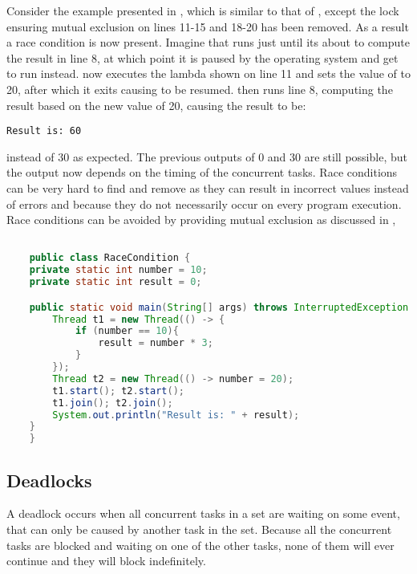 Consider the example presented in , which is similar to that of , except the lock ensuring mutual exclusion on lines 11-15 and 18-20 has been removed. As a result a race condition is now present. Imagine that  runs just until its about to compute the result in line 8, at which point it is paused by the operating system and  get to run instead.  now executes the lambda shown on line 11 and sets the value of  to 20, after which it exits causing  to be resumed.  then runs line 8, computing the result based on the new  value of 20, causing the result to be:
\begin{verbatim}
Result is: 60
\end{verbatim}
instead of 30 as expected. The previous outputs of 0 and 30 are still possible, but the output now depends on the timing of the concurrent tasks. Race conditions can be very hard to find and remove as they can result in incorrect values instead of errors and because they do not necessarily occur on every program execution. Race conditions can be avoided by providing mutual exclusion as discussed in ,
\begin{lstlisting}[label=lst:racecondition,
  caption={Race condition example},
  language=Java,  
  showspaces=false,
  showtabs=false,
  breaklines=true,
  showstringspaces=false,
  breakatwhitespace=true,
  commentstyle=\color{greencomments},
  keywordstyle=\color{bluekeywords},
  stringstyle=\color{redstrings}]  % Start your code-block

	public class RaceCondition {
    private static int number = 10;
    private static int result = 0;

    public static void main(String[] args) throws InterruptedException {
        Thread t1 = new Thread(() -> {
            if (number == 10){
                result = number * 3;
            }
        });
        Thread t2 = new Thread(() -> number = 20);
        t1.start(); t2.start();
        t1.join(); t2.join();
        System.out.println("Result is: " + result);
    }
	}
\end{lstlisting}
 
\subsection{Deadlocks}
A deadlock occurs when all concurrent tasks in a set are waiting on some event, that can only be caused by another task in the set\cite[p. 435]{tanenbaum2008modern}. Because all the concurrent tasks are blocked and waiting on one of the other tasks, none of them will ever continue and they will block indefinitely.

